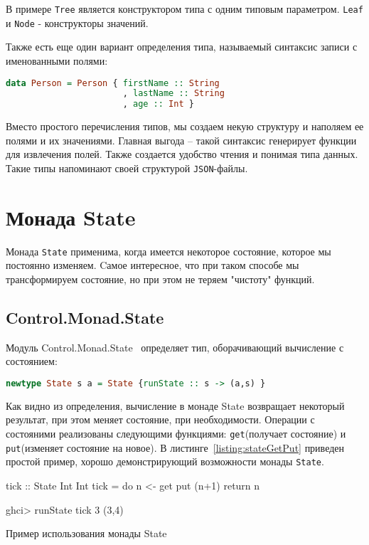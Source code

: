 В примере \lstinline{Tree} является конструктором типа с одним типовым параметром. \lstinline{Leaf} и \lstinline{Node} - конструкторы значений. 

Также есть еще один вариант определения типа, называемый синтаксис записи с именованными полями:

\begin{lstlisting}[language=Haskell]
data Person = Person { firstName :: String
                       , lastName :: String
                       , age :: Int }
\end{lstlisting}

Вместо простого перечисления типов, мы создаем некую структуру и наполяем ее полями и их значениями. Главная выгода – такой синтаксис генерирует функции для извлечения полей. Также создается удобство чтения и понимая типа данных. Такие типы напоминают своей структурой \lstinline{JSON}-файлы. 

\section{Монада State}

Монада \lstinline{State} применима, когда имеется некоторое состояние, которое мы постоянно изменяем. Cамое интересное, что при таком способе мы трансформируем состояние, но при этом не теряем "чистоту" функций. 

\subsection{Control.Monad.State}

Модуль Control.Monad.State~\cite{stateControl} определяет тип, оборачивающий вычисление с состоянием:

\begin{lstlisting}[language=Haskell]
newtype State s a = State {runState :: s -> (a,s) }
\end{lstlisting} 

Как видно из определения, вычисление в монаде State возвращает некоторый результат, при этом меняет состояние, при необходимости. Операции с состояними реализованы следующими функциями: \lstinline{get}(получает состояние) и \lstinline{put}(изменяет состояние на новое). В листинге~\ref{listing:stateGetPut} приведен простой пример, хорошо демонстрирующий возможности монады \lstinline{State}.

\begin{ListingEnv}[H]
\begin{Verb}
tick :: State Int Int
tick = do n <- get
	  put (n+1)
          return n

ghci> runState tick 3
(3,4)
\end{Verb}
\caption{Пример использования монады State}
\label{listing:stateGetPut}
\end{ListingEnv}

